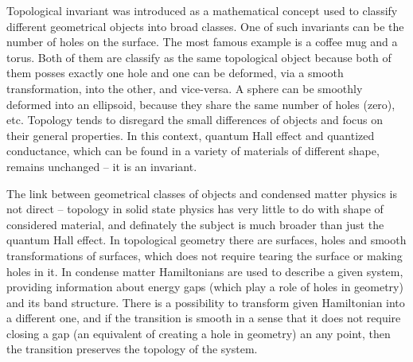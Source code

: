 \documentclass[titlepage,a4paper]{book}
\begin{document}
Topological invariant was introduced as a mathematical concept used to classify different geometrical objects into broad classes. One of such invariants can be the number of holes on the surface. The most famous example is a coffee mug and a torus. Both of them are classify as the same topological object because both of them posses exactly one hole and one can be deformed, via a smooth transformation, into the other, and vice-versa. A sphere can be smoothly deformed into an ellipsoid, because they share the same number of holes (zero), etc. Topology tends to disregard the small differences of objects and focus on their general properties. In this context, quantum Hall effect and quantized conductance, which can be found in a variety of materials of different shape, remains unchanged -- it is an invariant. 
 
The link between geometrical classes of objects and condensed matter physics is not direct -- topology in solid state physics has very little to do with shape of considered material, and definately the subject is much broader than just the quantum Hall effect. In topological geometry there are surfaces, holes and smooth transformations of surfaces, which does not require tearing the surface or making holes in it. In condense matter Hamiltonians are used to describe a given system, providing information about energy gaps (which play a role of holes in geometry) and its band structure. There is a possibility to transform given Hamiltonian into a different one, and if the transition is smooth in a sense that it does not require closing a gap (an equivalent of creating a hole in geometry) an any point, then the transition preserves the topology of the system.    
\end{document}
